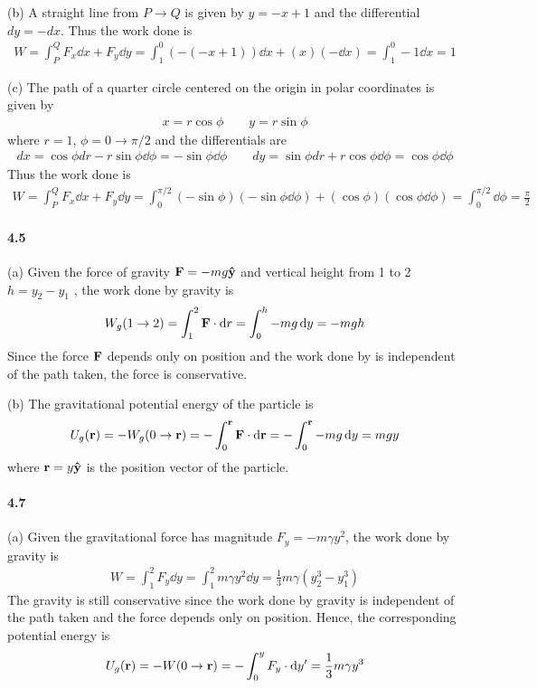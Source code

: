 \documentclass[../problems.tex]{subfiles}
\begin{document}
(b) A straight line from $P \to Q$ is given by $y = -x + 1$ and the differential $dy = -dx$. Thus
the work done is
\begin{align*}
    W = \int_P^Q F_x \dd{x} + F_y \dd{y} 
    = \int_1^0 (-(-x+1)) \dd{x} + (x) (-\dd{x}) = \int_1^0 -1 \dd{x} = 1
\end{align*}

(c) The path of a quarter circle centered on the origin in polar coordinates is given by
\begin{align*}
    x = r \cos \phi \qquad y = r \sin \phi
\end{align*}
where $r=1$, $\phi = 0 \to \pi/2$ and the differentials are
\begin{align*}
    dx = \cos \phi d{r} - r \sin \phi \dd{\phi} = - \sin \phi \dd{\phi} \qquad
    dy = \sin \phi d{r} + r \cos \phi \dd{\phi} = \cos \phi \dd{\phi}
\end{align*}
Thus the work done is
\begin{align*}
    W = \int_P^Q F_x \dd{x} + F_y \dd{y} 
    = \int_0^{\pi/2} (-\sin \phi) (-\sin \phi \dd{\phi}) + (\cos \phi) (\cos \phi \dd{\phi})
    = \int_0^{\pi/2} \dd\phi = \frac{\pi}{2}
\end{align*}

\paragraph{4.5}
(a) Given the force of gravity $\vb{F} = -mg \vu{y}$ and vertical height from 1 to 2 $h = y_2 - y_1$
, the work done by gravity is 
\begin{align*}
    W_{g}(1 \to 2) = \int_1^2 \vb{F} \cdot \dd{r} = \int_0^h -mg \dd{y} = -mgh
\end{align*}
Since the force $\vb{F}$ depends only on position and the work done by is independent of the path
taken, the force is conservative.

(b) The gravitational potential energy of the particle is 
\begin{align*}
    U_g(\vb{r}) = - W_g(0 \to \vb{r}) = - \int_0^{\vb{r}} \vb{F} \cdot \dd{\vb{r}} 
    = - \int_0^{\vb{r}} -mg \dd{y} = mgy
\end{align*}
where $\vb{r} = y\vu{y}$ is the position vector of the particle.

\paragraph{4.7}
(a) Given the gravitational force has magnitude $F_y = -m\gamma y^2$, the work done by gravity is
\begin{align*}
    W = \int_1^2 F_y \dd{y} = \int_1^2 m\gamma y^2 \dd{y} = \frac{1}{3} m\gamma (y_2^3-y_1^3)
\end{align*}
The gravity is still conservative since the work done by gravity is independent of the path taken
and the force depends only on position. Hence, the corresponding potential energy is
\begin{equation*}
    U_g(\vb{r}) = - W(0 \to \vb{r}) = - \int_0^{y} F_y \cdot \dd{y'} = \frac{1}{3} m\gamma y^3
\end{equation*}
\end{document}
